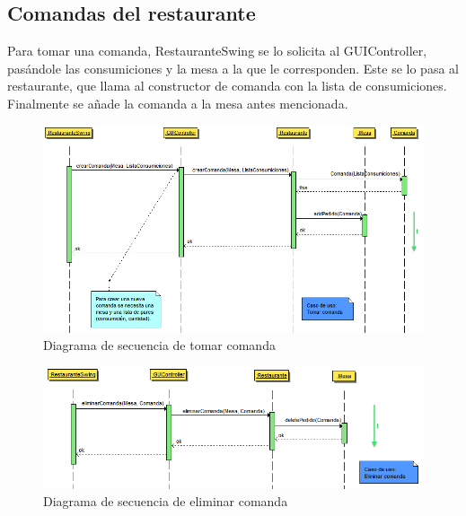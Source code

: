\documentclass[spanish,a4paper,11pt, twoside]{report}	%
\begin{document}
		


		\subsection{Comandas del restaurante}
		Para tomar una comanda, RestauranteSwing se lo solicita al GUIController, pasándole las consumiciones y la mesa a la que le corresponden. Este se lo pasa al restaurante, que llama al constructor de comanda con la lista de consumiciones. Finalmente se añade la comanda a la mesa antes mencionada.
		\begin{figure}[!h]
		\centering
		\includegraphics[scale=0.5]{DStomarcomanda.png}
		\caption{Diagrama de secuencia de tomar comanda }
		\end{figure}

		\begin{figure}[!h]
		\centering
		\includegraphics[scale=0.5]{DSeliminarcomanda.png}
		\caption{Diagrama de secuencia de eliminar comanda}
		\end{figure}
\end{document}

